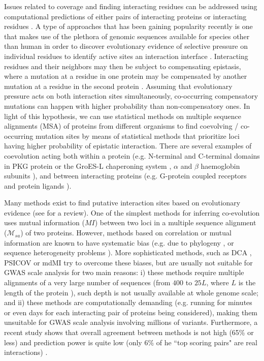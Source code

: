 Issues related to coverage and finding interacting residues can be addressed using computational predictions of either pairs of interacting proteins or interacting residues \cite{shoemaker2007deciphering}. A type of approaches that has been gaining popularity recently is one that makes use of the plethora of genomic sequences available for species other than human in order to discover evolutionary evidence of selective pressure on individual residues to identify active sites an  interaction interface \cite{marks2012protein}. Interacting residues and their neighbors may then be subject to compensating epistasis, where a mutation at a residue in one protein may be compensated by another mutation at a residue in the second protein \cite{pazos1997correlated}. Assuming that evolutionary pressure acts on both interaction sites simultaneously, co-occurring compensatory mutations can happen with higher probability than non-compensatory ones. In light of this hypothesis, we can use statistical methods on multiple sequence alignments (MSA) of proteins from different organisms to find coevolving / co-occurring mutation sites by means of statistical methods that prioritize loci having higher probability of epistatic interaction. There are several examples of coevolution acting both within a protein (e.g. N-terminal and C-terminal domains in PKG protein \cite{goh2000co} or the GroES-L chaperoning system \cite{ruiz2013coevolution}, $\alpha$ and $\beta$ haemoglobin subunits \cite{pazos1997correlated}), and between interacting proteins (e.g. G-protein coupled receptors and protein ligands \cite{goh2000co}).

Many methods exist to find putative interaction sites based on evolutionary evidence (see \cite{de2013emerging} for a review). One of the simplest methods for inferring co-evolution uses mutual information ($MI$) between two loci \cite{marks2012protein} in a multiple sequence alignment ($\mathcal{M}_{sa}$) of two proteins. However, methods based on correlation or mutual information are known to have systematic bias (e.g. due to phylogeny \cite{de2013emerging}, or sequence heterogeneity problems \cite{weigt2009identification}). More sophisticated methods, such as DCA \cite{morcos2011direct}, PSICOV \cite{jones2012psicov} or mdMI \cite{clark2014multidimensional} try to overcome these biases, but are usually not suitable for GWAS scale analysis for two main reasons: i) these methods require multiple alignments of a very large number of sequences (from $400$ to $25L$, where $L$ is the length of the protein \cite{clark2014multidimensional}), such depth is not usually available at whole genome scale; and ii) these methods are computationally demanding (e.g. running for minutes or even days for each interacting pair of proteins being considered), making them unsuitable for GWAS scale analysis involving millions of variants. Furthermore, a recent study shows that overall agreement between methods is not high (65\% or less) and prediction power is quite low (only 6\% of he ``top scoring pairs" are real interactions) \cite{clark2014multidimensional}.

